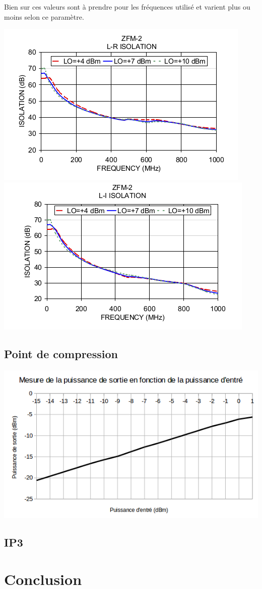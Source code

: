 \documentclass[a4paper,12pt]{report}            %
\begin{document}
    Bien sur ces valeurs sont à prendre pour les fréquences utilisé et varient plus ou moins
selon ce paramètre. \\
\begin{center}
\includegraphics[scale = 0.45]{pic/isolation1_datasheet.png}
\includegraphics[scale = 0.45]{pic/isolation2_datasheet.png}
\end{center}

\section{Point de compression}
\begin{center}\includegraphics[scale = 0.7]{pic/graph_pout.png}\\ \end{center}
\section{IP3}
\chapter{Conclusion}
\end{document}
